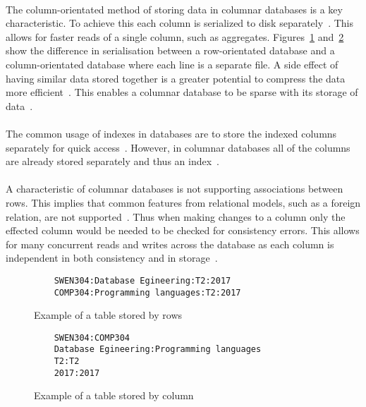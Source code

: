 \documentclass{CRPITStyle}
\renewcommand{\cite}{\citep}
\begin{document}
\paragraph{}
The column-orientated method of storing data in columnar databases is a
key characteristic.
To achieve this each column is serialized to disk
separately~\cite{bigtable,nosql_survey}.
This allows for faster reads of a single column, such as aggregates.
Figures~\ref{lst:row} and~\ref{lst:column} show the difference in serialisation
between a row-orientated database and a column-orientated database where each
line is a separate file.
A side effect of having similar data stored together is a greater potential to
compress the data more efficient~\cite{nosql_survey}.
This enables a columnar database to be sparse with its storage of data~\cite{bigtable}.

\paragraph{}
The common usage of indexes in databases are to store the indexed columns
separately for quick access~\cite{relational_db}.
However, in columnar databases all of the columns are already stored
separately and thus an index~\cite{nosql_survey}.

\paragraph{}
A characteristic of columnar databases is not supporting associations between
rows.
This implies that common features from relational models, such as a foreign relation,
are not supported~\cite{relational_db,nosql_survey}.
Thus when making changes to a column only the effected column would be needed
to be checked for consistency errors.
This allows for many concurrent reads and writes across the database as each
column is independent in both consistency and in storage~\cite{nosql_survey}.


\begin{figure}
\begin{verbatim}
    SWEN304:Database Egineering:T2:2017
    COMP304:Programming languages:T2:2017
\end{verbatim}
\caption{Example of a table stored by rows}
\label{lst:row}
\end{figure}

\begin{figure}
\begin{verbatim}
    SWEN304:COMP304
    Database Egineering:Programming languages
    T2:T2
    2017:2017
\end{verbatim}
\caption{Example of a table stored by column}
\label{lst:column}
\end{figure}
\end{document}
